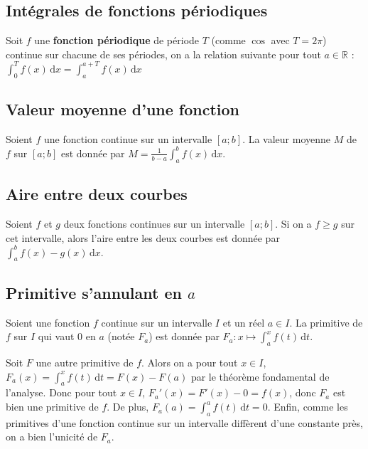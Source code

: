 	\subsection{Intégrales de fonctions périodiques}
	
	\begin{formula}
		Soit $f$ une \textbf{fonction périodique} de période $T$ (comme $\cos$ avec $T = 2\pi$) continue sur chacune de ses périodes, on a la relation suivante pour tout $a \in \mathbb{R}$ :
		\newpar
		$\displaystyle{\int_{0}^{T} f(x) \, \mathrm{d}x = \int_{a}^{a + T} f(x) \, \mathrm{d}x}$
	\end{formula}
	
	\subsection{Valeur moyenne d'une fonction}
	
	\begin{formula}
		Soient $f$ une fonction continue sur un intervalle $[a;b]$. La valeur moyenne $M$ de $f$ sur $[a;b]$ est donnée par $\displaystyle{M = \frac{1}{b-a}\int_{a}^{b} f(x) \, \mathrm{d}x}$.
	\end{formula}
	
	\subsection{Aire entre deux courbes}
	
	\begin{formula}
		Soient $f$ et $g$ deux fonctions continues sur un intervalle $[a;b]$. Si on a $f \geq g$ sur cet intervalle, alors l'aire entre les deux courbes est donnée par $\displaystyle{\int_{a}^{b} f(x) - g(x) \, \mathrm{d}x}$.
	\end{formula}
	
	\subsection{Primitive s'annulant en \texorpdfstring{$a$}{a}}
	
	\begin{formula}
		Soient une fonction $f$ continue sur un intervalle $I$ et un réel $a \in I$. La primitive de $f$ sur $I$ qui vaut $0$ en $a$ (notée $F_a$) est donnée par $\displaystyle{F_a : x \mapsto \int_{a}^{x} f(t) \, \mathrm{d}t}$.
	\end{formula}
	
	\begin{demonstration}
		Soit $F$ une autre primitive de $f$. Alors on a pour tout $x \in I$, $\displaystyle{F_a(x) = \int_a^x f(t) \, \mathrm{d}t} = F(x) - F(a)$ par le théorème fondamental de l'analyse.
		\newpar
		Donc pour tout $x \in I$, $F_a'(x) = F'(x) - 0 = f(x)$, donc $F_a$ est bien une primitive de $f$.
		\newpar
		De plus, $\displaystyle{F_a(a) = \int_{a}^{a} f(t) \, \mathrm{d}t = 0}$.
		\newpar
		Enfin, comme les primitives d'une fonction continue sur un intervalle diffèrent d'une constante près, on a bien l'unicité de $F_a$.
	\end{demonstration}
